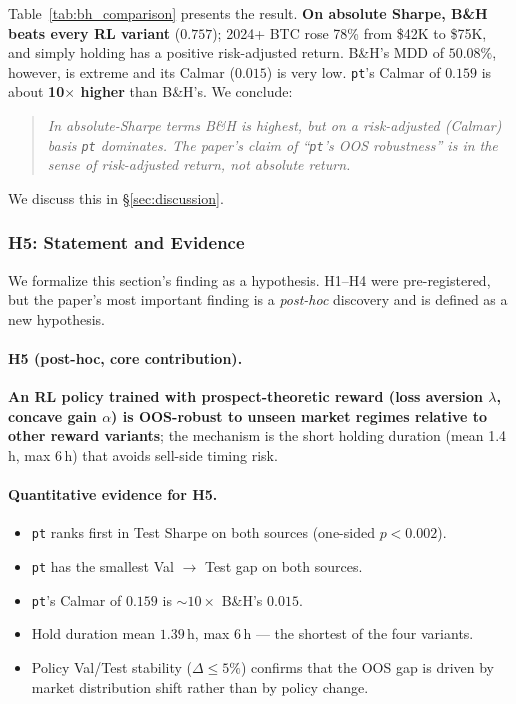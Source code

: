 \documentclass[11pt, a4paper]{article}
\begin{document}
Table~\ref{tab:bh_comparison} presents the result. \textbf{On absolute
Sharpe, B\&H beats every RL variant} ($0.757$); 2024+ BTC rose 78\% from
\$42K to \$75K, and simply holding has a positive risk-adjusted return. B\&H's
MDD of $50.08\%$, however, is extreme and its Calmar ($0.015$) is very low.
\texttt{pt}'s Calmar of $0.159$ is about \textbf{10$\times$ higher} than
B\&H's. We conclude:

\begin{quote}
\emph{In absolute-Sharpe terms B\&H is highest, but on a risk-adjusted
(Calmar) basis \texttt{pt} dominates. The paper's claim of ``\texttt{pt}'s
OOS robustness'' is in the sense of risk-adjusted return, not absolute
return.}
\end{quote}

We discuss this in \S\ref{sec:discussion}.

\subsubsection{H5: Statement and Evidence}
\label{sec:oos_h5}

We formalize this section's finding as a hypothesis. H1--H4 were pre-registered,
but the paper's most important finding is a \emph{post-hoc} discovery and is
defined as a new hypothesis.

\paragraph{H5 (post-hoc, core contribution).}
\textbf{An RL policy trained with prospect-theoretic reward (loss aversion
$\lambda$, concave gain $\alpha$) is OOS-robust to unseen market regimes
relative to other reward variants}; the mechanism is the short holding
duration (mean 1.4\,h, max 6\,h) that avoids sell-side timing risk.

\paragraph{Quantitative evidence for H5.}
\begin{itemize}[leftmargin=*]
\item \texttt{pt} ranks first in Test Sharpe on both sources (one-sided
$p < 0.002$).
\item \texttt{pt} has the smallest Val $\to$ Test gap on both sources.
\item \texttt{pt}'s Calmar of $0.159$ is $\sim 10\times$ B\&H's $0.015$.
\item Hold duration mean $1.39$\,h, max $6$\,h --- the shortest of the four
variants.
\item Policy Val/Test stability ($\Delta \leq 5\%$) confirms that the OOS
gap is driven by market distribution shift rather than by policy change.
\end{itemize}
\end{document}

